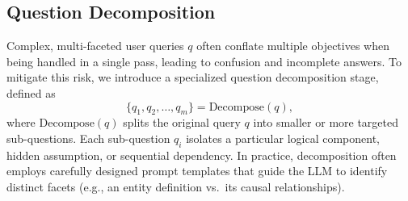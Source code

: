 \documentclass[runningheads]{llncs}
\begin{document}

\subsection{Question Decomposition}
\label{sec:question_decomposition}

Complex, multi-faceted user queries \(q\) often conflate multiple objectives when being handled in a single pass, leading to confusion and incomplete answers. To mitigate this risk, we introduce a specialized question decomposition stage, defined as
\begin{equation}
\label{eq:question_decompose}
\{q_1, q_2, \ldots, q_m\} = \mathrm{Decompose}(q),
\end{equation}
where \(\mathrm{Decompose}(q)\) splits the original query \(q\) into smaller or more targeted sub-questions. Each sub-question \(q_i\) isolates a particular logical component, hidden assumption, or sequential dependency. In practice, decomposition often employs carefully designed prompt templates that guide the LLM to identify distinct facets (e.g., an entity definition vs.\ its causal relationships).
\end{document}
